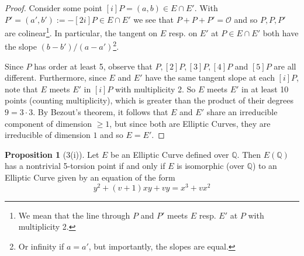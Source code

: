 \documentclass{scrartcl}
\newcommand{\Q}{\mathbb{Q}}
\renewcommand{\O}{\mathcal{O}}
\theoremstyle{definition}
\newtheorem{prop}[subsection]{Proposition}
\begin{document}
\begin{proof}
    Consider some point $[i] P = (a, b) \in E \cap E'$.
    With $P' = (a', b') := -[2i] P \in E \cap E'$ we see that $P + P + P' = \O$ and so $P, P, P'$ are colinear\footnote{We mean that the line through $P$ and $P'$ meets $E$ resp. $E'$ at $P$ with multiplicity 2.}.
    In particular, the tangent on $E$ resp. on $E'$ at $P \in E \cap E'$ both have the slope $(b - b')/(a - a')$\footnote{Or infinity if $a = a'$, but importantly, the slopes are equal.}.

    Since $P$ has order at least 5, observe that $P, [2]P, [3]P, [4]P$ and $[5]P$ are all different.
    Furthermore, since $E$ and $E'$ have the same tangent slope at each $[i] P$, note that $E$ meets $E'$ in $[i] P$ with multiplicity 2.
    So $E$ meets $E'$ in at least 10 points (counting multiplicity), which is greater than the product of their degrees $9 = 3 \cdot 3$.
    By Bezout's theorem, it follows that $E$ and $E'$ share an irreducible component of dimension $\geq 1$, but since both are Elliptic Curves, they are irreducible of dimension $1$ and so $E = E'$.
\end{proof}
\begin{prop}[3(i)]
    Let $E$ be an Elliptic Curve defined over $\Q$.
    Then $E(\Q)$ has a nontrivial 5-torsion point if and only if $E$ is isomorphic (over $\Q$) to an Elliptic Curve given by an equation of the form
    \begin{equation*}
        y^2 + (v + 1)x y + v y = x^3 + v x^2
    \end{equation*}
\end{prop}
\end{document}
